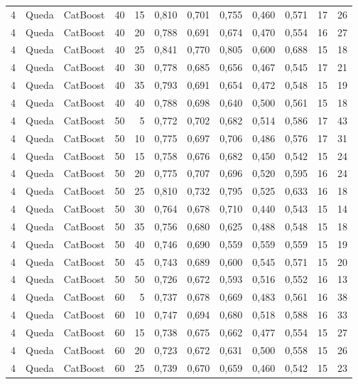 \begin{longtable}{@{}rllrrrrrrrrr@{}}
4 & Queda & CatBoost & 40 & 15 & 0,810 & 0,701 & 0,755 & 0,460 & 0,571 & 17 & 26 \\
4 & Queda & CatBoost & 40 & 20 & 0,788 & 0,691 & 0,674 & 0,470 & 0,554 & 16 & 27 \\
4 & Queda & CatBoost & 40 & 25 & 0,841 & 0,770 & 0,805 & 0,600 & 0,688 & 15 & 18 \\
4 & Queda & CatBoost & 40 & 30 & 0,778 & 0,685 & 0,656 & 0,467 & 0,545 & 17 & 21 \\
4 & Queda & CatBoost & 40 & 35 & 0,793 & 0,691 & 0,654 & 0,472 & 0,548 & 15 & 19 \\
4 & Queda & CatBoost & 40 & 40 & 0,788 & 0,698 & 0,640 & 0,500 & 0,561 & 15 & 18 \\
4 & Queda & CatBoost & 50 & 5 & 0,772 & 0,702 & 0,682 & 0,514 & 0,586 & 17 & 43 \\
4 & Queda & CatBoost & 50 & 10 & 0,775 & 0,697 & 0,706 & 0,486 & 0,576 & 17 & 31 \\
4 & Queda & CatBoost & 50 & 15 & 0,758 & 0,676 & 0,682 & 0,450 & 0,542 & 15 & 24 \\
4 & Queda & CatBoost & 50 & 20 & 0,775 & 0,707 & 0,696 & 0,520 & 0,595 & 16 & 24 \\
4 & Queda & CatBoost & 50 & 25 & 0,810 & 0,732 & 0,795 & 0,525 & 0,633 & 16 & 18 \\
4 & Queda & CatBoost & 50 & 30 & 0,764 & 0,678 & 0,710 & 0,440 & 0,543 & 15 & 14 \\
4 & Queda & CatBoost & 50 & 35 & 0,756 & 0,680 & 0,625 & 0,488 & 0,548 & 15 & 18 \\
4 & Queda & CatBoost & 50 & 40 & 0,746 & 0,690 & 0,559 & 0,559 & 0,559 & 15 & 19 \\
4 & Queda & CatBoost & 50 & 45 & 0,743 & 0,689 & 0,600 & 0,545 & 0,571 & 15 & 20 \\
4 & Queda & CatBoost & 50 & 50 & 0,726 & 0,672 & 0,593 & 0,516 & 0,552 & 16 & 13 \\
4 & Queda & CatBoost & 60 & 5 & 0,737 & 0,678 & 0,669 & 0,483 & 0,561 & 16 & 38 \\
4 & Queda & CatBoost & 60 & 10 & 0,747 & 0,694 & 0,680 & 0,518 & 0,588 & 16 & 33 \\
4 & Queda & CatBoost & 60 & 15 & 0,738 & 0,675 & 0,662 & 0,477 & 0,554 & 15 & 27 \\
4 & Queda & CatBoost & 60 & 20 & 0,723 & 0,672 & 0,631 & 0,500 & 0,558 & 15 & 26 \\
4 & Queda & CatBoost & 60 & 25 & 0,739 & 0,670 & 0,659 & 0,460 & 0,542 & 15 & 23 \\

\end{longtable}
